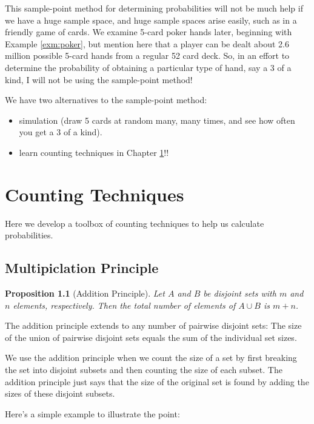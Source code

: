 \documentclass[
]{book}
\providecommand{\tightlist}{%
  \setlength{\itemsep}{0pt}\setlength{\parskip}{0pt}}
\newtheorem{proposition}{Proposition}[chapter]
\theoremstyle{definition}
\theoremstyle{definition}
\theoremstyle{definition}
\theoremstyle{definition}
\theoremstyle{remark}
\begin{document}
This sample-point method for determining probabilities will not be much help if we have a huge sample space, and huge sample spaces arise easily, such as in a friendly game of cards. We examine 5-card poker hands later, beginning with Example \ref{exm:poker}, but mention here that a player can be dealt about 2.6 million possible 5-card hands from a regular 52 card deck. So, in an effort to determine the probability of obtaining a particular type of hand, say a 3 of a kind, I will not be using the sample-point method!

We have two alternatives to the sample-point method:

\begin{itemize}
\tightlist
\item
  simulation (draw 5 cards at random many, many times, and see how often you get a 3 of a kind).
\item
  learn counting techniques in Chapter \ref{counting}!!
\end{itemize}

\chapter{Counting Techniques}\label{counting}

Here we develop a toolbox of counting techniques to help us calculate probabilities.

\section{Multipiclation Principle}\label{multipiclation-principle}

\begin{proposition}[Addition Principle]
Let \(A\) and \(B\) be disjoint sets with \(m\) and \(n\) elements, respectively. Then the total number of elements of \(A \cup B\) is \(m+n\).
\end{proposition}

The addition principle extends to any number of pairwise disjoint sets: The size of the union of pairwise disjoint sets equals the sum of the individual set sizes.

We use the addition principle when we count the size of a set by first breaking the set into disjoint subsets and then counting the size of each subset. The addition principle just says that the size of the original set is found by adding the sizes of these disjoint subsets.

Here's a simple example to illustrate the point:
\end{document}
